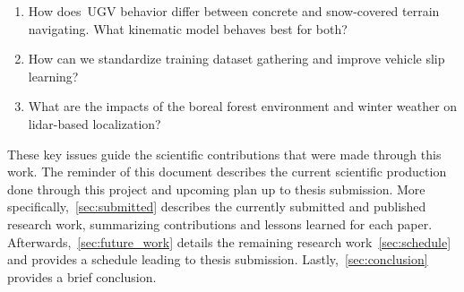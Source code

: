 \begin{enumerate}\bfseries
  	\item How does~\ac{UGV} behavior differ between concrete and snow-covered terrain navigating. What kinematic model behaves best for both?
  	\item How can we standardize training dataset gathering and improve vehicle slip learning?
	\item What are the impacts of the boreal forest environment and winter weather on lidar-based localization?
\end{enumerate}

These key issues guide the scientific contributions that were made through this work.
The reminder of this document describes the current scientific production done through this project and upcoming plan up to thesis submission.
More specifically,~\autoref{sec:submitted} describes the currently submitted and published research work, summarizing contributions and lessons learned for each paper. 
Afterwards,~\autoref{sec:future_work} details the remaining research work~\autoref{sec:schedule} and provides a schedule leading to thesis submission.
Lastly,~\autoref{sec:conclusion} provides a brief conclusion.
